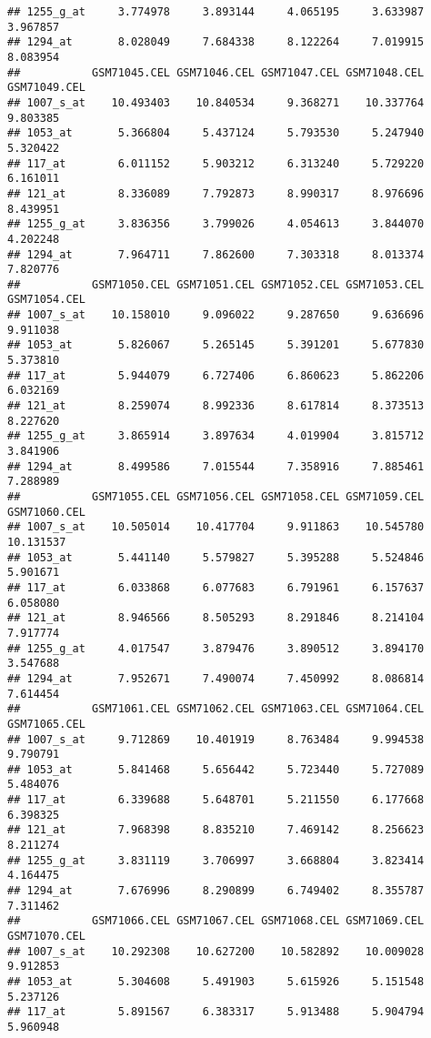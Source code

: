 \documentclass[]{article}
\begin{document}
\begin{verbatim}
## 1255_g_at     3.774978     3.893144     4.065195     3.633987     3.967857
## 1294_at       8.028049     7.684338     8.122264     7.019915     8.083954
##           GSM71045.CEL GSM71046.CEL GSM71047.CEL GSM71048.CEL GSM71049.CEL
## 1007_s_at    10.493403    10.840534     9.368271    10.337764     9.803385
## 1053_at       5.366804     5.437124     5.793530     5.247940     5.320422
## 117_at        6.011152     5.903212     6.313240     5.729220     6.161011
## 121_at        8.336089     7.792873     8.990317     8.976696     8.439951
## 1255_g_at     3.836356     3.799026     4.054613     3.844070     4.202248
## 1294_at       7.964711     7.862600     7.303318     8.013374     7.820776
##           GSM71050.CEL GSM71051.CEL GSM71052.CEL GSM71053.CEL GSM71054.CEL
## 1007_s_at    10.158010     9.096022     9.287650     9.636696     9.911038
## 1053_at       5.826067     5.265145     5.391201     5.677830     5.373810
## 117_at        5.944079     6.727406     6.860623     5.862206     6.032169
## 121_at        8.259074     8.992336     8.617814     8.373513     8.227620
## 1255_g_at     3.865914     3.897634     4.019904     3.815712     3.841906
## 1294_at       8.499586     7.015544     7.358916     7.885461     7.288989
##           GSM71055.CEL GSM71056.CEL GSM71058.CEL GSM71059.CEL GSM71060.CEL
## 1007_s_at    10.505014    10.417704     9.911863    10.545780    10.131537
## 1053_at       5.441140     5.579827     5.395288     5.524846     5.901671
## 117_at        6.033868     6.077683     6.791961     6.157637     6.058080
## 121_at        8.946566     8.505293     8.291846     8.214104     7.917774
## 1255_g_at     4.017547     3.879476     3.890512     3.894170     3.547688
## 1294_at       7.952671     7.490074     7.450992     8.086814     7.614454
##           GSM71061.CEL GSM71062.CEL GSM71063.CEL GSM71064.CEL GSM71065.CEL
## 1007_s_at     9.712869    10.401919     8.763484     9.994538     9.790791
## 1053_at       5.841468     5.656442     5.723440     5.727089     5.484076
## 117_at        6.339688     5.648701     5.211550     6.177668     6.398325
## 121_at        7.968398     8.835210     7.469142     8.256623     8.211274
## 1255_g_at     3.831119     3.706997     3.668804     3.823414     4.164475
## 1294_at       7.676996     8.290899     6.749402     8.355787     7.311462
##           GSM71066.CEL GSM71067.CEL GSM71068.CEL GSM71069.CEL GSM71070.CEL
## 1007_s_at    10.292308    10.627200    10.582892    10.009028     9.912853
## 1053_at       5.304608     5.491903     5.615926     5.151548     5.237126
## 117_at        5.891567     6.383317     5.913488     5.904794     5.960948

\end{verbatim}
\end{document}
